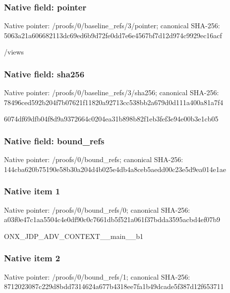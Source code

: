 \documentclass[10pt,a4paper]{article}
\begin{document}
\subsubsection{Native field: pointer}
Native pointer: /proofs/0/baseline\_\allowbreak{}refs/3/pointer; canonical SHA-256: 5063a21a606682113dc69ed6b9d72fe0dd7e6e4567bf7d12d974c9929ec16acf

\begingroup\raggedright\sloppy /\allowbreak{}views\par\endgroup

\subsubsection{Native field: sha256}
Native pointer: /proofs/0/baseline\_\allowbreak{}refs/3/sha256; canonical SHA-256: 78496ced592b204f7b07621f11820a92713cc538bb2a679d0d111a400a81a7f4

\begingroup\raggedright\sloppy 6074df69dfb04f8d9a9372664c0204ea31b898b82f1eb3fef3e94e00b3e1cb05\par\endgroup

\subsubsection{Native field: bound\_\allowbreak{}refs}
Native pointer: /proofs/0/bound\_\allowbreak{}refs; canonical SHA-256: 144cba620b75190e58b30a204d4b025e4db4a8ceb5aedd00c23e5d9ea014e1ae

\subsubsection{Native item 1}
Native pointer: /proofs/0/bound\_\allowbreak{}refs/0; canonical SHA-256: a03f0e47c1aa5504c4e0df90c0c7661db5f521a061f37bdda3595acbd4ef07b9

\begingroup\raggedright\sloppy ONX\_\allowbreak{}JDP\_\allowbreak{}ADV\_\allowbreak{}CONTEXT\_\allowbreak{}\_\allowbreak{}main\_\allowbreak{}\_\allowbreak{}b1\par\endgroup

\subsubsection{Native item 2}
Native pointer: /proofs/0/bound\_\allowbreak{}refs/1; canonical SHA-256: 8712023087c229d8bdd7314624a677b4318ee7fa1b49dcade5f387d12f653711
\end{document}
